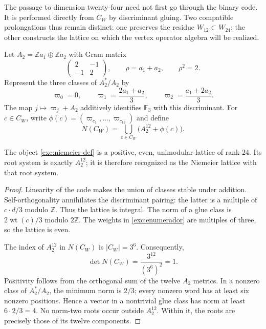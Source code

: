 The passage to dimension twenty-four need not first go through the
binary code. It is performed directly from $C_W$ by discriminant
gluing. Two compatible prolongations thus remain distinct:
one preserves the residue $W_{12}\subset W_{24}$; the other constructs the
lattice on which the vertex operator algebra will be realized.

Let $A_2=\mathbb Z a_1\oplus\mathbb Z a_2$ with Gram matrix
\[
 \begin{pmatrix}2&-1\\-1&2\end{pmatrix},
 \qquad \rho=a_1+a_2,\qquad \rho^2=2.
\]
Represent the three classes of $A_2^*/A_2$ by
\[
 \varpi_0=0,\qquad
 \varpi_1=\frac{2a_1+a_2}{3},\qquad
 \varpi_2=\frac{a_1+2a_2}{3}.
\]
The map $j\mapsto\varpi_j+A_2$ additively identifies
$\mathbb F_3$ with this discriminant. For $c\in C_W$, write
$\phi(c)=(\varpi_{c_1},\ldots,\varpi_{c_{12}})$ and define
\begin{equation}
 N(C_W)=\bigcup_{c\in C_W}\bigl(A_2^{12}+\phi(c)\bigr).
 \label{exc:niemeier-def}
\end{equation}

\begin{theorem}
\label{exc:niemeier-teorema}
The object \eqref{exc:niemeier-def} is a positive, even,
unimodular lattice of rank $24$. Its root system is exactly
$A_2^{12}$; it is therefore recognized as the Niemeier lattice with
that root system.
\end{theorem}

\begin{proof}
Linearity of the code makes the union of classes stable under
addition. Self-orthogonality annihilates the discriminant pairing:
the latter is a multiple of $c\cdot d/3$ modulo $\mathbb Z$. Thus the
lattice is integral. The norm of a glue class is
$2\operatorname{wt}(c)/3$ modulo $2\mathbb Z$. The weights in
\eqref{exc:enumerador} are multiples of three, so the lattice is even.

The index of $A_2^{12}$ in $N(C_W)$ is $|C_W|=3^6$. Consequently,
\[
 \det N(C_W)=\frac{3^{12}}{(3^6)^2}=1.
\]
Positivity follows from the orthogonal sum of the twelve $A_2$ metrics.
In a nonzero class of $A_2^*/A_2$, the minimum norm is $2/3$;
every nonzero word has at least six nonzero positions.
Hence a vector in a nontrivial glue class has norm
at least $6\cdot2/3=4$. No norm-two roots occur outside
$A_2^{12}$. Within it, the roots are precisely those of its
twelve components.
\end{proof}

